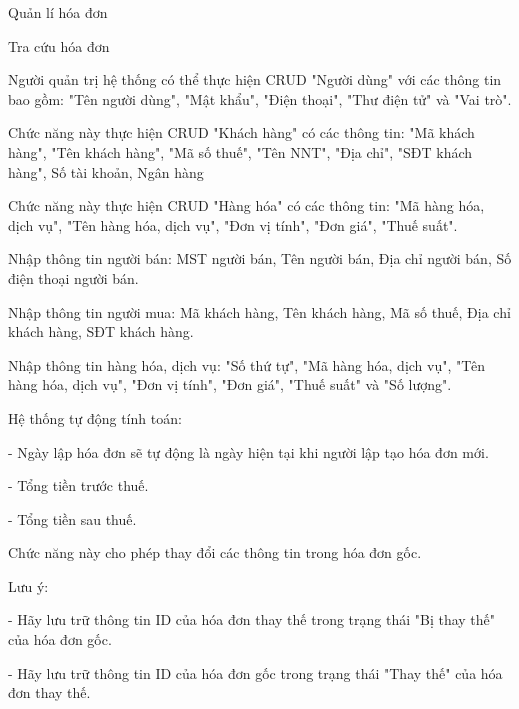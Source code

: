 Quản lí hóa đơn

Tra cứu hóa đơn


Người quản trị hệ thống có thể thực hiện CRUD "Người dùng" với các thông tin bao gồm: "Tên người dùng", "Mật khẩu", "Điện thoại", "Thư điện tử" và "Vai trò".



Chức năng này thực hiện CRUD "Khách hàng" có các thông tin: "Mã khách hàng", "Tên khách hàng", "Mã số thuế", "Tên NNT", "Địa chỉ", "SĐT khách hàng", Số tài khoản, Ngân hàng


Chức năng này thực hiện CRUD "Hàng hóa" có các thông tin: "Mã hàng hóa, dịch vụ", "Tên hàng hóa, dịch vụ", "Đơn vị tính", "Đơn giá", "Thuế suất".



Nhập thông tin người bán: MST người bán, Tên người bán, Địa chỉ người bán, Số điện thoại người bán.

Nhập thông tin người mua: Mã khách hàng, Tên khách hàng, Mã số thuế, Địa chỉ khách hàng, SĐT khách hàng.

Nhập thông tin hàng hóa, dịch vụ: "Số thứ tự", "Mã hàng hóa, dịch vụ", "Tên hàng hóa, dịch vụ", "Đơn vị tính", "Đơn giá", "Thuế suất" và "Số lượng".

Hệ thống tự động tính toán:

- Ngày lập hóa đơn sẽ tự động là ngày hiện tại khi người lập tạo hóa đơn mới.

- Tổng tiền trước thuế.

- Tổng tiền sau thuế.


Chức năng này cho phép thay đổi các thông tin trong hóa đơn gốc.

Lưu ý:

- Hãy lưu trữ thông tin ID của hóa đơn thay thế trong trạng thái "Bị thay thế" của hóa đơn gốc.

- Hãy lưu trữ thông tin ID của hóa đơn gốc trong trạng thái "Thay thế" của hóa đơn thay thế.


